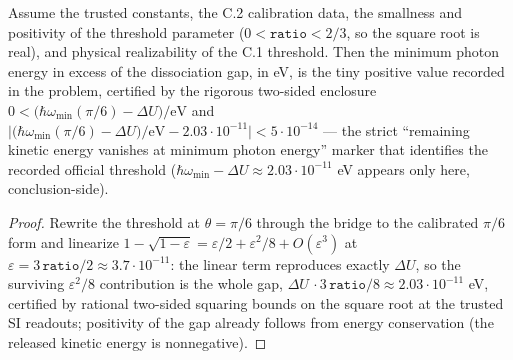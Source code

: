\begin{theorem}
\label{thm:IPhO2026Problems_problem_IPhO_2026_1_C_2:excess_photon_energy_at_threshold}
Assume the trusted constants, the C.2 calibration data, the smallness and
positivity of the threshold parameter ($0 < \texttt{ratio} < 2/3$, so the
square root is real), and physical realizability of the C.1 threshold.  Then
the minimum photon energy in excess of the dissociation gap, in eV, is the
tiny positive value recorded in the problem, certified by the rigorous
two-sided enclosure
$0 < \bigl(\hbar\omega_{\min}(\pi/6) - \Delta U\bigr)/\mathrm{eV}$ and
$\bigl|\bigl(\hbar\omega_{\min}(\pi/6) - \Delta U\bigr)/\mathrm{eV}
- 2.03{\cdot}10^{-11}\bigr| < 5{\cdot}10^{-14}$ --- the strict
``remaining kinetic energy vanishes at minimum photon energy'' marker that
identifies the recorded official threshold ($\hbar\omega_{\min} - \Delta U
\approx 2.03{\cdot}10^{-11}$ eV appears only here, conclusion-side).
\end{theorem}
\begin{proof}
Rewrite the threshold at $\theta = \pi/6$ through the bridge to the
calibrated $\pi/6$ form and linearize $1 - \sqrt{1 - \varepsilon}
= \varepsilon/2 + \varepsilon^2/8 + O(\varepsilon^3)$ at
$\varepsilon = 3\,\texttt{ratio}/2 \approx 3.7{\cdot}10^{-11}$: the linear
term reproduces exactly $\Delta U$, so the surviving
$\varepsilon^2/8$ contribution is the whole gap,
$\Delta U\, \cdot 3\,\texttt{ratio}/8 \approx 2.03{\cdot}10^{-11}$ eV,
certified by rational two-sided squaring bounds on the square root at the
trusted SI readouts; positivity of the gap already follows from energy
conservation (the released kinetic energy is nonnegative).
\end{proof}

